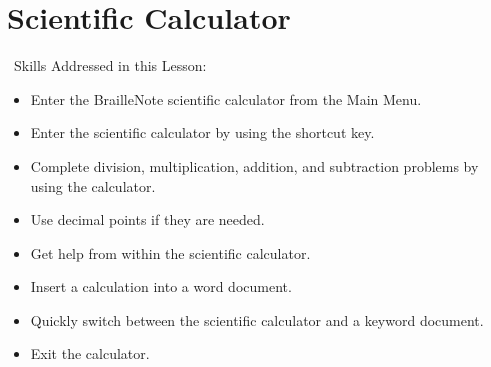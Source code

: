 \documentclass[10pt,letterpaper,twoside]{report}
\begin{document}
{{{\section{ Scientific Calculator}
\
Skills Addressed in this Lesson:
\begin{itemize}
	\item Enter the BrailleNote scientific calculator from the Main Menu.
	\item Enter the scientific calculator by using the shortcut key.
	\item Complete division, multiplication, addition, and subtraction problems by using the calculator.
	\item Use decimal points if they are needed.
	\item Get help from within the scientific calculator.
	\item Insert a calculation into a word document.
	\item Quickly switch between the scientific calculator and a keyword document.
	\item Exit the calculator.
\end{itemize}
}}}
\end{document}
